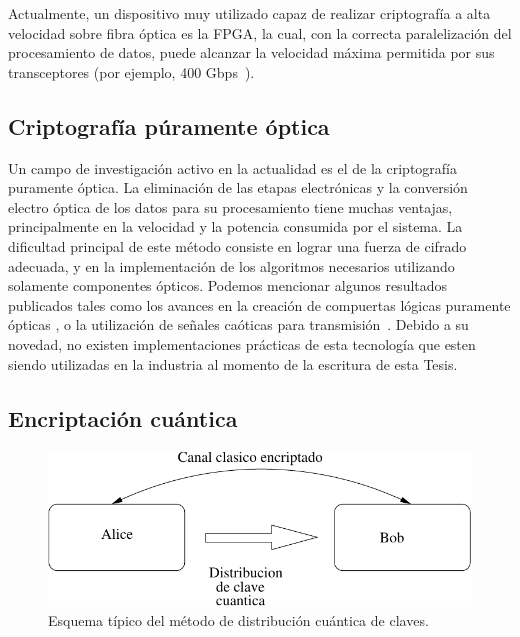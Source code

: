 Actualmente, un dispositivo muy utilizado capaz de realizar criptografía a alta velocidad sobre fibra óptica es la FPGA, la cual, con la correcta paralelización del procesamiento de datos, puede alcanzar la velocidad máxima permitida por sus transceptores (por ejemplo, 400 Gbps~\cite{Algotronix}).

\subsection{Criptografía púramente óptica}
\label{optocry}
Un campo de investigación activo en la actualidad es el de la criptografía puramente óptica. La eliminación de las etapas electrónicas y la conversión electro óptica de los datos para su procesamiento tiene muchas ventajas, principalmente en la velocidad y la potencia consumida por el sistema.
La dificultad principal de este método consiste en lograr una fuerza de cifrado adecuada, y en la implementación de los algoritmos necesarios utilizando solamente componentes ópticos. Podemos mencionar algunos resultados publicados tales como los avances en la creación de compuertas lógicas puramente ópticas \cite{jung2008demonstration}, o la utilización de señales caóticas para transmisión~\cite{liu2002synchronized}.
Debido a su novedad, no existen implementaciones prácticas de esta tecnología que esten siendo utilizadas en la industria al momento de la escritura de esta Tesis.


\subsection{Encriptación cuántica}

\begin{figure}[t]
  \centering
  \includegraphics[width=0.7 \textwidth]{graphs/quantum} 
  \caption{Esquema típico del método de distribución cuántica de claves.}
  \label{fig_quant}
\end{figure}


